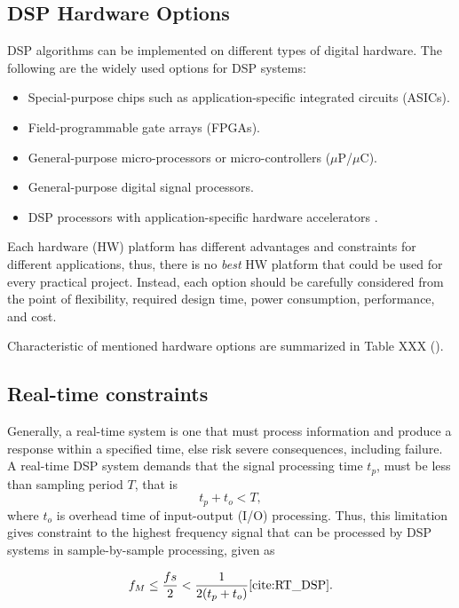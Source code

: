 \documentclass[twoside]{ctuthesis}
\theoremstyle{plain}
\theoremstyle{definition}
\theoremstyle{note}
\begin{document}
\subsection{DSP Hardware Options}
DSP algorithms can be implemented on different types of digital hardware. The following are the widely used options for DSP systems:
\begin{itemize}
	\setlength{\itemsep}{5pt}
	\item Special-purpose chips such as application-specific integrated circuits (ASICs).
	\item Field-programmable gate arrays (FPGAs).
	\item General-purpose micro-processors or micro-controllers ($\mu$P/$\mu$C).
	\item General-purpose digital signal processors.
	\item DSP processors with application-specific hardware accelerators \cite{cite:RT_DSP}.
\end{itemize}

Each hardware (HW) platform has different advantages and constraints for different applications, thus, there is no \textit{best} HW platform that could be used for every practical project. Instead, each option should be carefully considered from the point of flexibility, required design time, power consumption, performance, and cost. 

Characteristic of mentioned hardware options are summarized in Table XXX (\cite{cite:RT_DSP}).

\subsection{Real-time constraints}
\label{R-T constrains}
Generally, a real-time system is one that must process information and produce a response within a specified time, else risk severe consequences, including failure. A real-time DSP system demands that the signal processing time $t_{p}$, must be less than sampling period $T$, that is
\begin{equation} \label{eq:hardRealTime1}
	t_{p}+t_{o}<T,
\end{equation}
where $t_{o}$ is overhead time of input-output (I/O) processing.
Thus, this limitation gives constraint to the highest frequency signal that can be processed by DSP systems in sample-by-sample processing, given as

\begin{equation} \label{eq:hardRealTime2}
	f_{M} \leq \frac{fs}{2} < \frac{1}{2(t_{p}+t_{o})} \cite{cite:RT_DSP}.
\end{equation}
\end{document}
